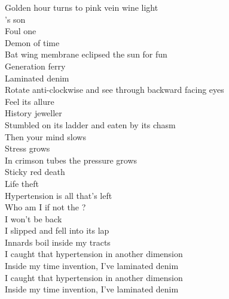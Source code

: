 Golden hour turns to pink vein wine light \\
's son \\
Foul one \\
Demon of time \\
Bat wing membrane eclipsed the sun for fun \\

Generation ferry \\
Laminated denim \\
Rotate anti-clockwise and see through backward facing eyes \\
Feel its allure \\
History jeweller \\
Stumbled on its ladder and eaten by its chasm \\
Then your mind slows \\
Stress grows \\
In crimson tubes the pressure grows \\
Sticky red death \\
Life theft \\
Hypertension is all that's left \\

Who am I if not the ? \\
I won't be back \\
I slipped and fell into its lap \\
Innards boil inside my tracts \\

I caught that hypertension in another dimension \\
Inside my time invention, I've laminated denim \\

I caught that hypertension in another dimension \\
Inside my time invention, I've laminated denim \\
